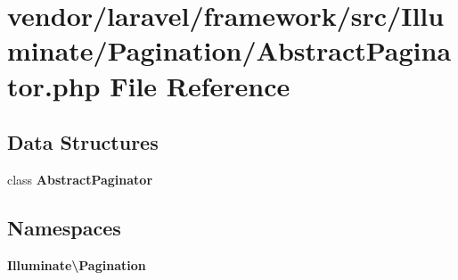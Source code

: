 \section{vendor/laravel/framework/src/\+Illuminate/\+Pagination/\+Abstract\+Paginator.php File Reference}
\label{_abstract_paginator_8php}
\subsection*{Data Structures}
\begin{DoxyCompactItemize}
\item 
class {\bf Abstract\+Paginator}
\end{DoxyCompactItemize}
\subsection*{Namespaces}
\begin{DoxyCompactItemize}
\item 
 {\bf Illuminate\textbackslash{}\+Pagination}
\end{DoxyCompactItemize}
